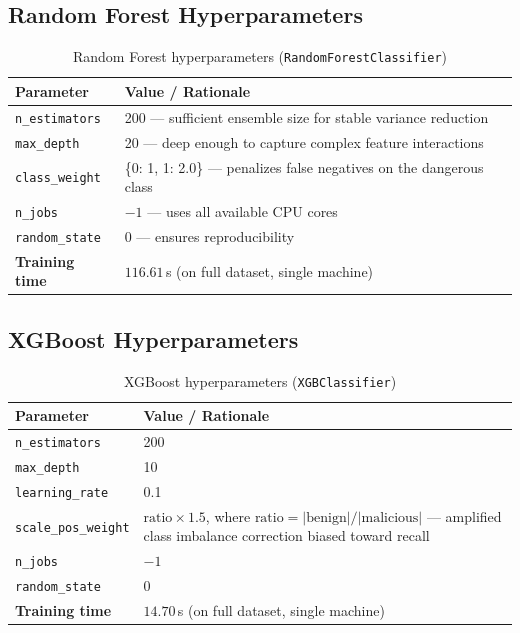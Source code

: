 \documentclass[12pt,a4paper]{article}
\begin{document}
\subsection{Random Forest Hyperparameters}

\begin{table}[H]
    \centering
    \begin{tabularx}{\textwidth}{lX}
        \toprule
        \textbf{Parameter} & \textbf{Value / Rationale} \\
        \midrule
        \texttt{n\_estimators}  & 200 --- sufficient ensemble size for stable variance reduction \\
        \texttt{max\_depth}     & 20 --- deep enough to capture complex feature interactions \\
        \texttt{class\_weight}  & \{0: 1, 1: 2.0\} --- penalizes false negatives on the dangerous class \\
        \texttt{n\_jobs}        & $-1$ --- uses all available CPU cores \\
        \texttt{random\_state}  & 0 --- ensures reproducibility \\
        \textbf{Training time}  & $116.61$\,s (on full dataset, single machine) \\
        \bottomrule
    \end{tabularx}
    \caption{Random Forest hyperparameters (\texttt{RandomForestClassifier})}
    \label{tab:rf_params}
\end{table}

\subsection{XGBoost Hyperparameters}

\begin{table}[H]
    \centering
    \begin{tabularx}{\textwidth}{lX}
        \toprule
        \textbf{Parameter} & \textbf{Value / Rationale} \\
        \midrule
        \texttt{n\_estimators}      & 200 \\
        \texttt{max\_depth}         & 10 \\
        \texttt{learning\_rate}     & 0.1 \\
        \texttt{scale\_pos\_weight} & $\text{ratio} \times 1.5$, where $\text{ratio} = |\text{benign}| / |\text{malicious}|$ --- amplified class imbalance correction biased toward recall \\
        \texttt{n\_jobs}            & $-1$ \\
        \texttt{random\_state}      & 0 \\
        \textbf{Training time}      & $14.70$\,s (on full dataset, single machine) \\
        \bottomrule
    \end{tabularx}
    \caption{XGBoost hyperparameters (\texttt{XGBClassifier})}
    \label{tab:xgb_params}
\end{table}
\end{document}
